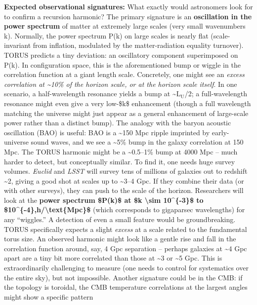 \documentclass[]{article}
\newcommand{\subscript}[1]{\ensuremath{_{\mathrm{#1}}}}
\begin{document}
\textbf{Expected observational signatures:} What exactly would
astronomers look for to confirm a recursion harmonic? The primary
signature is an \textbf{oscillation in the power spectrum} of matter at
extremely large scales (very small wavenumbers k). Normally, the power
spectrum P(k) on large scales is nearly flat (scale-invariant from
inflation, modulated by the matter-radiation equality turnover). TORUS
predicts a tiny deviation: an oscillatory component superimposed on
P(k). In configuration space, this is the aforementioned bump or wiggle
in the correlation function at a giant length scale. Concretely, one
might see an \emph{excess correlation at \textasciitilde{}10\% of the
horizon scale, or at the horizon scale itself}. In one scenario, a
half-wavelength resonance yields a bump at
\textasciitilde{}L\subscript{U}/2;
a full-wavelength resonance might even give a very low-\$k\$ enhancement
(though a full wavelength matching the universe might just appear as a
general enhancement of large-scale power rather than a distinct bump).
The analogy with the baryon acoustic oscillation (BAO) is useful: BAO is
a \textasciitilde{}150 Mpc ripple imprinted by early-universe sound
waves, and we see a \textasciitilde{}5\% bump in the galaxy correlation
at 150 Mpc. The TORUS harmonic might be a \textasciitilde{}0.5--1\% bump
at 4000 Mpc -- much harder to detect, but conceptually similar. To find
it, one needs huge survey volumes. \emph{Euclid} and \emph{LSST} will
survey tens of millions of galaxies out to redshift \textasciitilde{}2,
giving a good shot at scales up to \textasciitilde{}3--4 Gpc. If they
combine their data (or with other surveys), they can push to the scale
of the horizon. Researchers will look at the \textbf{power spectrum
\$P(k)\$ at \$k \textbackslash{}sim 10\^{}\{-3\}\$ to
\$10\^{}\{-4\},h/\textbackslash{}text\{Mpc\}\$} (which corresponds to
gigaparsec wavelengths) for any ``wiggles.'' A detection of even a small
feature would be groundbreaking. TORUS specifically expects a slight
\emph{excess} at a scale related to the fundamental torus size​. An
observed harmonic might look like a gentle rise and fall in the
correlation function around, say, 4 Gpc separation -- perhaps galaxies
at \textasciitilde{}4 Gpc apart are a tiny bit more correlated than
those at \textasciitilde{}3 or \textasciitilde{}5 Gpc. This is
extraordinarily challenging to measure (one needs to control for
systematics over the entire sky), but not impossible. Another signature
could be in the CMB: if the topology is toroidal, the CMB temperature
correlations at the largest angles might show a specific pattern
\end{document}
